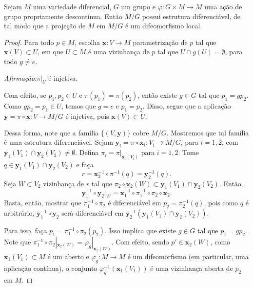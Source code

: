 	\begin{proposition}
		\label{prop:estrutura-variedade-quociente}
		Sejam $M$ uma variedade diferencial, $G$ um grupo e $\varphi:G\times M\to M$ uma ação de grupo propriamente descontínua. Então $M/G$ possui estrutura diferenciável, de tal modo que a projeção de $M$ em $M/G$ é um difeomorfismo local.
		\begin{proof}

			Para todo $p \in M$, escolha $\mathbf{x}:V\to M$ parametrização de $p$ tal que $\mathbf{x}(V)\subset U$, em que $U\subset M$ é uma vizinhança de $p$ tal que $U\cap g(U)=\emptyset$, para todo $g \neq e$.

			\emph{Afirmação:}$\pi|_{U}$ é injetiva.

			Com efeito, se $p_{1}, p_{2} \in U$ e $\pi(p_{1})=\pi(p_{2})$, então existe $g \in G$ tal que $p_{1}=gp_{2}$. Como $gp_{2}=p_{1} \in U$, temos que $g=e$ e $p_{1}=p_{2}$.
			Disso, segue que a aplicação $\mathbf{y}=\pi \circ \mathbf{x}:V\to M/G$ é injetiva, pois $\mathbf{x}(V)\subset U$.

			Dessa forma, note que a família $\{ (V, \mathbf{y}) \}$ cobre $M/G$. Mostremos que tal família é uma estrutura diferenciável. Sejam $\mathbf{y}_{i}=\pi \circ \mathbf{x}_{i}:V_{i}\to M/G$, para $i=1, 2$, com $\mathbf{y}_{1}(V_{1})\cap \mathbf{y}_{2}(V_{2})\neq \emptyset$.
			Defina $\pi_{i}=\pi|_{\mathbf{x}_{i}(V_{i})}$ para $i=1, 2$.
			Tome $q \in \mathbf{y}_{1}(V_{1})\cap \mathbf{y}_{2}(V_{2})$ e faça
			\begin{equation*}
				r =\mathbf{x}_{2}^{-1} \circ \pi ^{-1}(q)=\mathbf{y}_{2}^{-1}(q).
			\end{equation*}
			Seja $W \subset V_{2}$ vizinhança de $r$ tal que $\pi_{2} \circ \mathbf{x}_{2}(W)\subset \mathbf{y}_{1}(V_{1})\cap \mathbf{y}_{2}(V_{2})$. Então,
			\begin{equation*}
				\mathbf{y}_{1}^{-1} \circ \mathbf{y}_{2}|_{W}=\mathbf{x}_{1}^{-1} \circ \pi_{1} ^{-1} \circ\pi_{2} \circ \mathbf{x}_{2}.
			\end{equation*}
			Basta, então, mostrar que $\pi_{1}^{-1} \circ \pi_{2}$ é diferenciável em $p_{2} = \pi_{2}^{-1}(q)$, pois como $q$ é arbitrário, $\mathbf{y}_{1}^{-1} \circ \mathbf{y}_{2}$ será diferenciável em $\mathbf{y}_{2}^{-1}(\mathbf{y}_{1}(V_{1})\cap \mathbf{y}_{2}(V_{2}))$.

			Para isso, faça $p_{1}=\pi_{1}^{-1} \circ\pi_{2}(p_{2})$. Isso implica que existe $g \in G$ tal que $p_{1}=gp_{2}$. Note que $\pi_{1}^{-1}\circ\pi_{2}|_{\mathbf{x}_{2}(W)}=\varphi_{g}|_{\mathbf{x}_{2}(W)}$. Com efeito, sendo $p' \in \mathbf{x}_{2}(W)$, como $\mathbf{x}_1(V_1) \subset M$ é um aberto e $\varphi_g: M \to M$ é um difeomorfismo (em particular, uma aplicação contínua), o conjunto $\varphi_g^{-1}(\mathbf{x}_1(V_1))$ é uma vizinhança aberta de $p_2$ em $M$.


\end{proof}
\end{proposition}
